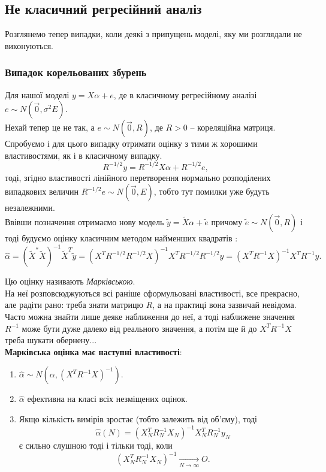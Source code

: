 \subsection{Не класичний регресійний аналіз}

Розглянемо тепер випадки, коли деякі з припущень моделі, яку ми розглядали не виконуються.

\subsubsection{Випадок корельованих збурень}

Для нашої моделі $ y = X \alpha + e$, де в класичному регресійному аналізі $e \sim N(\vec0, \sigma^2E)$. \\

Нехай тепер це не так, а $e \sim N(\vec0, R)$, де $R > 0$ -- кореляційна матриця. Спробуємо і для цього випадку отримати оцінку з тими ж хорошими властивостями, як і в класичному випадку. \\

\[ R^{-1/2}y = R^{-1/2}X\alpha + R^{-1/2}e, \] тоді, згідно властивості лінійного перетворення нормально розподілених випадкових величин $R^{-1/2}e \sim N(\vec0, E)$, тобто тут помилки уже будуть незалежними. \\

Ввівши позначення отримаємо нову модель $\widetilde{y} = \widetilde{X}\alpha + \widetilde{e}$ причому $\widetilde{e}\sim N(\vec0,R)$ і тоді будуємо оцінку класичним методом найменших квадратів : \[ \widehat{\alpha} = (\widetilde{X}^*\widetilde{X})^{-1}\widetilde{X}^T\widetilde{y}=(X^TR^{-1/2}R^{-1/2}X)^{-1}X^TR^{-1/2}R^{-1/2}y=(X^TR^{-1}X)^{-1}X^TR^{-1}y. \]

Цю оцінку називають \textit{Марківською}. \\

На неї розповсюджуються всі раніше сформульовані властивості, все прекрасно, але радіти рано: треба знати матрицю $R$, а на практиці вона зазвичай невідома. Часто можна знайти лише деяке наближення до неї, а тоді наближене значення $R^{-1}$ може бути дуже далеко від реального значення, а потім ще й до $X^TR^{-1}X$ треба шукати обернену... \\

\textbf{Марківська оцінка має наступні властивості}:
\begin{enumerate}
	\item $\widehat{\alpha}\sim N(\alpha, (X^TR^{-1}X)^{-1})$. 
	
	\item $\widehat{\alpha}$ ефективна на класі всіх незміщених оцінок.

	\item Якщо кількість вимірів зростає (тобто залежить від об’єму), тоді \[ \widehat{\alpha}(N) = (X_N^TR_N^{-1}X_N)^{-1}X_N^TR_N^{-1}y_N \] є сильно слушною тоді і тільки тоді, коли \[ (X_N^TR_N^{-1}X_N)^{-1} \xrightarrow[N\to\infty]{} O. \]
\end{enumerate}

